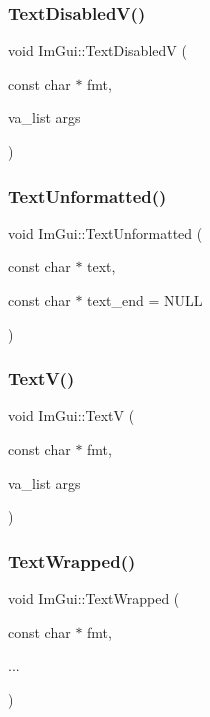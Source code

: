 \subsubsection{\texorpdfstring{Text\+Disabled\+V()}{TextDisabledV()}}
{\footnotesize\ttfamily void Im\+Gui\+::\+Text\+DisabledV (\begin{DoxyParamCaption}\item[{const char $\ast$}]{fmt,  }\item[{va\+\_\+list}]{args }\end{DoxyParamCaption})}

\hypertarget{namespace_im_gui_a96a5f42789ecc419b2ae8af7b2acc28e}{}\label{namespace_im_gui_a96a5f42789ecc419b2ae8af7b2acc28e} 
\subsubsection{\texorpdfstring{Text\+Unformatted()}{TextUnformatted()}}
{\footnotesize\ttfamily void Im\+Gui\+::\+Text\+Unformatted (\begin{DoxyParamCaption}\item[{const char $\ast$}]{text,  }\item[{const char $\ast$}]{text\+\_\+end = {\ttfamily NULL} }\end{DoxyParamCaption})}

\hypertarget{namespace_im_gui_a10a0d6362178c2f743092f21e1b6cd20}{}\label{namespace_im_gui_a10a0d6362178c2f743092f21e1b6cd20} 
\subsubsection{\texorpdfstring{Text\+V()}{TextV()}}
{\footnotesize\ttfamily void Im\+Gui\+::\+TextV (\begin{DoxyParamCaption}\item[{const char $\ast$}]{fmt,  }\item[{va\+\_\+list}]{args }\end{DoxyParamCaption})}

\hypertarget{namespace_im_gui_ad57bb15c599e73b2ccc7c0f7de6e5823}{}\label{namespace_im_gui_ad57bb15c599e73b2ccc7c0f7de6e5823} 
\subsubsection{\texorpdfstring{Text\+Wrapped()}{TextWrapped()}}
{\footnotesize\ttfamily void Im\+Gui\+::\+Text\+Wrapped (\begin{DoxyParamCaption}\item[{const char $\ast$}]{fmt,  }\item[{}]{... }\end{DoxyParamCaption})}

